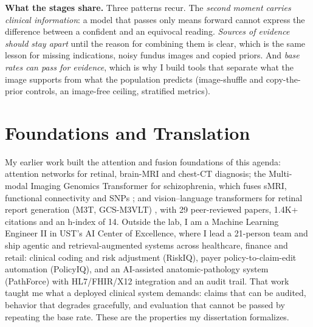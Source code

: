 \documentclass[10pt,letterpaper]{article}
\begin{document}
\textbf{What the stages share.} Three patterns recur. The \emph{second moment carries clinical information}: a model that passes only means forward cannot express the difference between a confident and an equivocal reading. \emph{Sources of evidence should stay apart} until the reason for combining them is clear, which is the same lesson for missing indications, noisy fundus images and copied priors. And \emph{base rates can pass for evidence}, which is why I build tools that separate what the image supports from what the population predicts (image-shuffle and copy-the-prior controls, an image-free ceiling, stratified metrics).

\section{Foundations and Translation}
My earlier work built the attention and fusion foundations of this agenda: attention networks for retinal, brain-MRI and chest-CT diagnosis; the Multi-modal Imaging Genomics Transformer for schizophrenia, which fuses sMRI, functional connectivity and SNPs \cite{migtrans}; and vision--language transformers for retinal report generation (M3T, GCS-M3VLT) \cite{m3t,gcsm3vlt}, with 29 peer-reviewed papers, 1.4K+ citations and an h-index of 14. Outside the lab, I am a Machine Learning Engineer II in UST's AI Center of Excellence, where I lead a 21-person team and ship agentic and retrieval-augmented systems across healthcare, finance and retail: clinical coding and risk adjustment (RiskIQ), payer policy-to-claim-edit automation (PolicyIQ), and an AI-assisted anatomic-pathology system (PathForce) with HL7/FHIR/X12 integration and an audit trail. That work taught me what a deployed clinical system demands: claims that can be audited, behavior that degrades gracefully, and evaluation that cannot be passed by repeating the base rate. These are the properties my dissertation formalizes.
\end{document}
